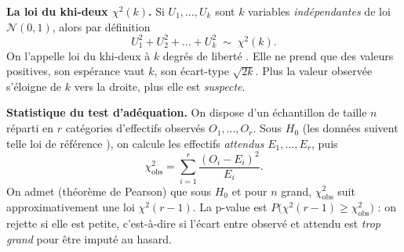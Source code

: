 \begin{mdframed}[backgroundcolor=ThemeLight, linecolor=Theme,
  linewidth=1pt, innertopmargin=8pt, innerbottommargin=8pt]
\textbf{La loi du khi-deux $\chi^2(k)$.} Si $U_1, \dots, U_k$ sont $k$ variables \emph{indépendantes} de loi $\mathcal{N}(0,1)$, alors par définition
\[
  U_1^2 + U_2^2 + \dots + U_k^2 \;\sim\; \chi^2(k).
\]
On l'appelle \og loi du khi-deux à $k$ degrés de liberté \fg{}. Elle ne prend que des valeurs positives, son espérance vaut $k$, son écart-type $\sqrt{2k}$. Plus la valeur observée s'éloigne de $k$ vers la droite, plus elle est \emph{suspecte}.

\begin{center}
\end{center}

\smallskip

\textbf{Statistique du test d'adéquation.} On dispose d'un échantillon de taille $n$ réparti en $r$ catégories d'effectifs observés $O_1, \dots, O_r$. Sous $H_0$ (\og les données suivent telle loi de référence \fg), on calcule les effectifs \emph{attendus} $E_1, \dots, E_r$, puis
\[
  \boxed{\;\chi^2_{\text{obs}} = \sum_{i=1}^{r} \dfrac{(O_i - E_i)^2}{E_i}.\;}
\]
On admet (théorème de Pearson) que sous $H_0$ et pour $n$ grand, $\chi^2_{\text{obs}}$ suit approximativement une loi $\chi^2(r-1)$. La p-value est $P\!\bigl(\chi^2(r-1) \ge \chi^2_{\text{obs}}\bigr)$ : on rejette si elle est petite, c'est-à-dire si l'écart entre observé et attendu est \emph{trop grand} pour être imputé au hasard.
\end{mdframed}

